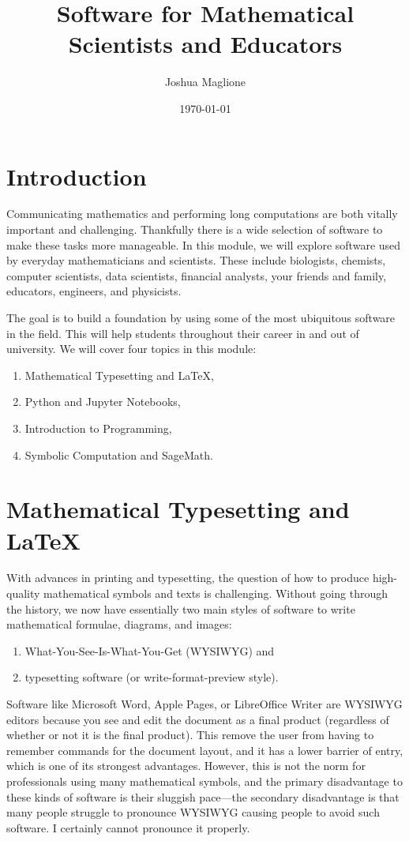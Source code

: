 \documentclass[a4paper, 12pt]{article}
\title{Software for Mathematical Scientists and Educators}
\author{Joshua Maglione}
\date{\today}
\numberwithin{equation}{section}
\numberwithin{figure}{section}
\theoremstyle{definition}
\begin{document}
\maketitle
\tableofcontents

\section*{Introduction}

Communicating mathematics and performing long computations are both vitally
important and challenging. Thankfully there is a wide selection of software to
make these tasks more manageable. In this module, we will explore software used
by everyday mathematicians and scientists. These include biologists, chemists,
computer scientists, data scientists, financial analysts, your friends and
family, educators, engineers, and physicists. 

The goal is to build a foundation by using some of the most ubiquitous software
in the field. This will help students throughout their career in and out of
university. We will cover four topics in this module:
\begin{enumerate} 
	\item Mathematical Typesetting and \LaTeX,
	\item Python and Jupyter Notebooks,
	\item Introduction to Programming,
	\item Symbolic Computation and SageMath.
\end{enumerate}


\section{Mathematical Typesetting and \LaTeX}

With advances in printing and typesetting, the question of how to produce
high-quality mathematical symbols and texts is challenging. Without going
through the history, we now have essentially two main styles of software to
write mathematical formulae, diagrams, and images:
\begin{enumerate}
	\item What-You-See-Is-What-You-Get (WYSIWYG) and
	\item typesetting software (or write-format-preview style).
\end{enumerate}

Software like Microsoft Word, Apple Pages, or LibreOffice Writer are WYSIWYG
editors because you see and edit the document as a final product (regardless of
whether or not it is the final product). This remove the user from having to
remember commands for the document layout, and it has a lower barrier of entry,
which is one of its strongest advantages. However, this is not the norm for
professionals using many mathematical symbols, and the primary disadvantage to
these kinds of software is their sluggish pace---the secondary disadvantage is
that many people struggle to pronounce WYSIWYG causing people to avoid such
software. I certainly cannot pronounce it properly.
\end{document}
